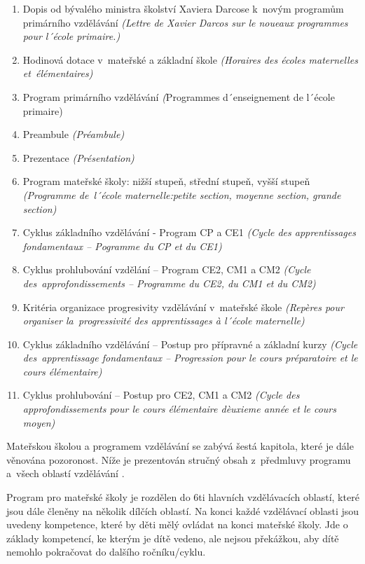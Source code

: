 	\begin{enumerate}[1]
		\setlength\itemsep{-2mm}
		\item Dopis od bývalého ministra školství Xaviera Darcose k novým programům primárního vzdělávání \textit{(Lettre de Xavier Darcos sur le noueaux programmes pour l´école primaire.)}
		\item Hodinová dotace v mateřské a základní škole \textit{(Horaires des écoles maternelles et élémentaires)}
		\item Program primárního vzdělávání \textit({Programmes d´enseignement  de l´école primaire)}
		\item Preambule \textit{(Préambule)}
		\item Prezentace \textit{(Présentation)}
		\item Program mateřské školy: nižší stupeň, střední stupeň, vyšší stupeň \textit{(Programme de l´école maternelle:petite section, moyenne section, grande section)}
		\item Cyklus základního vzdělávání - Program CP a CE1 \textit{(Cycle des apprentissages fondamentaux – Pogramme du CP et du CE1)}
		\item Cyklus prohlubování vzdělání – Program CE2, CM1 a CM2 \textit{(Cycle des approfondissements – Programme du CE2, du CM1 et du CM2)}
		\item Kritéria organizace progresivity vzdělávání v mateřské škole \textit{(Repères pour organiser la progressivité des apprentissages à l´école maternelle)}
		\item Cyklus základního vzdělávání – Postup pro přípravné a základní kurzy \textit{(Cycle des apprentissage fondamentaux – Progression pour le cours préparatoire et le cours élémentaire)}
		\item Cyklus prohlubování – Postup pro CE2, CM1 a CM2 \textit{(Cycle des approfondissements pour le cours élémentaire dèuxieme année et le cours moyen)}
	\end{enumerate}


	Mateřskou školou a programem vzdělávání se zabývá šestá kapitola, které je dále věnována pozoronost. Níže je prezentován stručný obsah z předmluvy programu a všech oblastí vzdělávání \citep{program}.

	Program pro mateřské školy je rozdělen do 6ti hlavních vzdělávacích oblastí, které jsou dále členěny na několik dílčích oblastí.
	Na konci každé vzdělávací oblasti jsou uvedeny kompetence, které by děti mělý ovládat na konci mateřské školy. Jde o základy kompetencí, ke kterým je dítě vedeno, ale nejsou překážkou, aby dítě nemohlo pokračovat do dalšího ročníku/cyklu.


